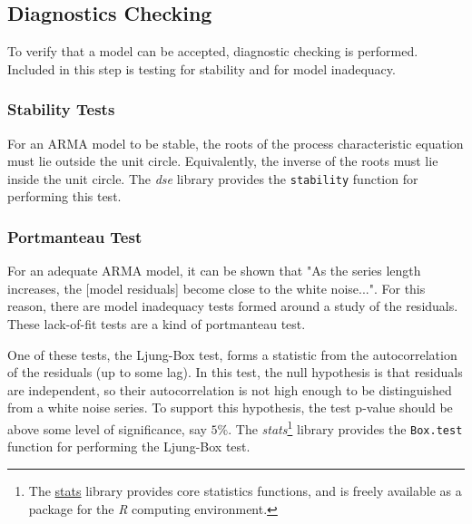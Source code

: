 \documentclass[a4paper]{scrartcl}
\begin{document}
\subsection*{Diagnostics Checking}
To verify that a model can be accepted, diagnostic checking is performed. Included in this step is testing for stability and for model inadequacy.

\subsubsection*{Stability Tests}
For an ARMA model to be stable, the roots of the process characteristic equation must lie outside the unit circle\cite[p. 56]{box_jenkins_reinsel_2008}. Equivalently, the inverse of the roots must lie inside the unit circle. The \textit{dse} library provides the \texttt{stability} function for performing this test.

\subsubsection*{Portmanteau Test}
For an adequate ARMA model, it can be shown that "As the series length increases, the [model residuals] become close to the white noise..."\cite[p. 338]{box_jenkins_reinsel_2008}. For this reason, there are model inadequacy tests formed around a study of the residuals. These lack-of-fit tests are a kind of portmanteau test.

One of these tests, the Ljung-Box test, forms a statistic from the autocorrelation of the residuals (up to some lag). In this test, the null hypothesis is that residuals are independent, so their autocorrelation is not high enough to be distinguished from a white noise series. To support this hypothesis, the test p-value should be above some level of significance, say $5\%$. The \textit{stats}\footnote{The \href{http://stat.ethz.ch/R-manual/R-patched/library/stats/html/00Index.html}{stats} library provides core statistics functions, and is freely available as a package for the \textit{R} computing environment.} library provides the \texttt{Box.test} function for performing the Ljung-Box test.
\end{document}
